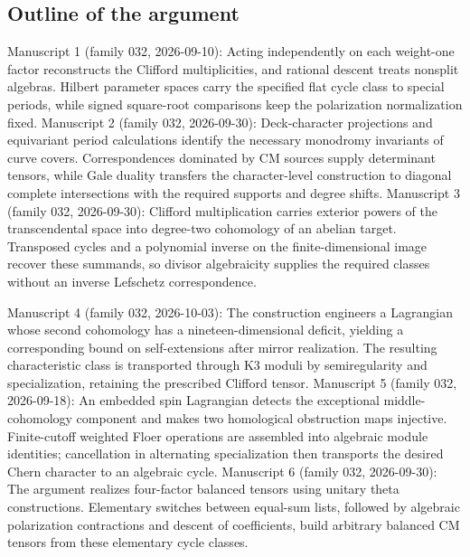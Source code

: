 \documentclass[11pt]{article}
\begin{document}
\subsection{Outline of the argument}
Manuscript 1 (family 032, 2026-09-10): Acting independently on each weight-one factor reconstructs the Clifford multiplicities, and rational descent treats nonsplit algebras. Hilbert parameter spaces carry the specified flat cycle class to special periods, while signed square-root comparisons keep the polarization normalization fixed. Manuscript 2 (family 032, 2026-09-30): Deck-character projections and equivariant period calculations identify the necessary monodromy invariants of curve covers. Correspondences dominated by CM sources supply determinant tensors, while Gale duality transfers the character-level construction to diagonal complete intersections with the required supports and degree shifts. Manuscript 3 (family 032, 2026-09-30): Clifford multiplication carries exterior powers of the transcendental space into degree-two cohomology of an abelian target. Transposed cycles and a polynomial inverse on the finite-dimensional image recover these summands, so divisor algebraicity supplies the required classes without an inverse Lefschetz correspondence.

Manuscript 4 (family 032, 2026-10-03): The construction engineers a Lagrangian whose second cohomology has a nineteen-dimensional deficit, yielding a corresponding bound on self-extensions after mirror realization. The resulting characteristic class is transported through K3 moduli by semiregularity and specialization, retaining the prescribed Clifford tensor. Manuscript 5 (family 032, 2026-09-18): An embedded spin Lagrangian detects the exceptional middle-cohomology component and makes two homological obstruction maps injective. Finite-cutoff weighted Floer operations are assembled into algebraic module identities; cancellation in alternating specialization then transports the desired Chern character to an algebraic cycle. Manuscript 6 (family 032, 2026-09-30): The argument realizes four-factor balanced tensors using unitary theta constructions. Elementary switches between equal-sum lists, followed by algebraic polarization contractions and descent of coefficients, build arbitrary balanced CM tensors from these elementary cycle classes.
\end{document}
